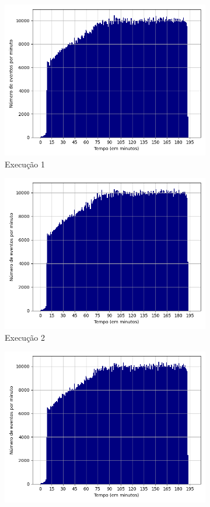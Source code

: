 \begin{figure}[h!]
\begin{subfigure}{.5\textwidth}
  \centering
  \includegraphics[width=.8\linewidth]{figuras/graphics/histogram_vazao_5-dez-su.png}  
  \caption{Execução 1}
  \label{fig:histv-5-dez-su}
\end{subfigure}
\begin{subfigure}{.5\textwidth}
  \centering
  \includegraphics[width=.8\linewidth]{figuras/graphics/histogram_vazao_7-dez-su.png}  
  \caption{Execução 2}
  \label{fig:histv-7-dez-su}
\end{subfigure}
\begin{subfigure}{.5\textwidth}
  \centering
  \includegraphics[width=.8\linewidth]{figuras/graphics/histogram_vazao_8-dez-su.png} 

\end{subfigure}
\end{figure}
